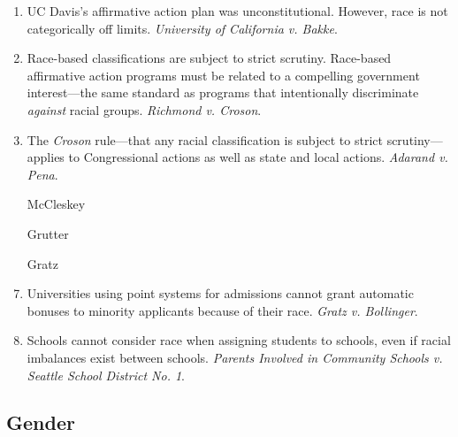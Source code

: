 \begin{enumerate}
\begin{enumerate}
        \item ``Departures from the normal procedural 
        sequence.''\footnote{Casebook p. 1040.}
        \item Substantive departures from normal procedure.
        \item Legislative or administrative history.
    \end{enumerate}
    \item UC Davis's affirmative action plan was unconstitutional. However, 
    race is not categorically off limits. \emph{University of California v. 
    Bakke}. %
    \item Race-based classifications are subject to strict scrutiny. 
    Race-based affirmative action programs must be related to a compelling 
    government interest---the same standard as programs that intentionally 
    discriminate \emph{against} racial groups. \emph{Richmond v. Croson}.
    \item The \emph{Croson} rule---that any racial classification is subject 
    to strict scrutiny---applies to Congressional actions as well as state and 
    local actions. \emph{Adarand v. Pena}.
    \item [McCleskey] %
    \item [Grutter] %
    \item [Gratz] %
    \item Universities using point systems for admissions cannot grant 
    automatic bonuses to minority applicants because of their race. 
    \emph{Gratz v. Bollinger}.
    \item Schools cannot consider race when assigning students to schools, 
    even if racial imbalances exist between schools. \emph{Parents Involved in 
    Community Schools v. Seattle School District No. 1}.
\end{enumerate}

\subsection{Gender}


